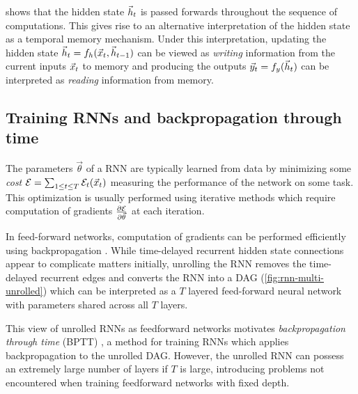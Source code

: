  shows that the hidden state $\vec{h}_t$ is passed
forwards throughout the sequence of computations. This gives rise to an
alternative interpretation of the hidden state as a temporal memory mechanism.
Under this interpretation, updating the hidden state $\vec{h}_t = f_h (\vec{x}_t,
\vec{h}_{t-1})$ can be viewed as \emph{writing} information from the current inputs
$\vec{x}_t$ to memory and producing the outputs $\vec{y}_t = f_y (\vec{h}_t)$ can be
interpreted as \emph{reading} information from memory.



\subsection{Training RNNs and backpropagation through time}


The parameters $\vec{\theta}$ of a RNN are typically learned from data by
minimizing some \emph{cost} $\mathcal{E} = \sum_{1 \leq t \leq T}
\mathcal{E}_t(\vec{x}_t)$ measuring the performance of the network on some task.
This optimization is usually performed using iterative methods which require
computation of gradients $\frac{\partial \mathcal{E}}{\partial \vec{\theta}}$ at each
iteration.

In feed-forward networks, computation of gradients can be performed efficiently
using backpropagation
\citep{bryson1963optimal,linnainmaa1970representation,rumelhart1988learning}.
While time-delayed recurrent hidden state connections appear to complicate
matters initially, unrolling the RNN removes the time-delayed recurrent edges
and converts the RNN into a DAG (\eg \vref{fig:rnn-multi-unrolled}) which can
be interpreted as a $T$ layered feed-forward neural network with parameters
shared across all $T$ layers.

This view of unrolled RNNs as feedforward networks motivates
\emph{backpropagation through time} (BPTT) \citep{goller1996learning}, a method
for training RNNs which applies backpropagation to the unrolled DAG. However,
the unrolled RNN can possess an extremely large number of layers if $T$ is
large, introducing problems not encountered when training feedforward networks
with fixed depth.

